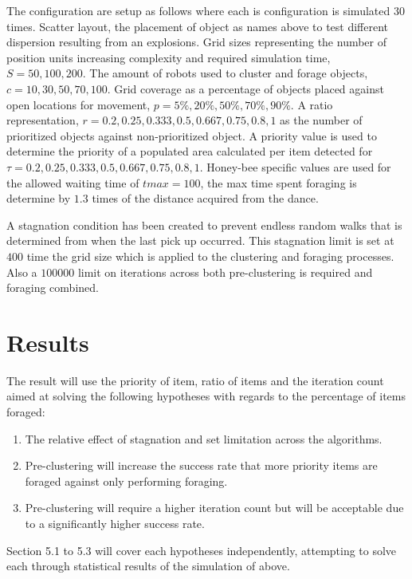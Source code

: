 \documentclass[12pt]{article}
\begin{document}
\par{The configuration are setup as follows where each is configuration is simulated 30 times. Scatter layout, the placement of object as names above to test different dispersion resulting from an explosions. Grid sizes representing the number of position units increasing complexity and required simulation time, $S = 50, 100, 200$. The amount of robots used to cluster and forage objects, $c = 10, 30, 50, 70, 100$. Grid coverage as a percentage of objects placed against open locations for movement, $p = 5\%, 20\%, 50\%, 70\%, 90\%$. A ratio representation, $r = 0.2, 0.25, 0.333, 0.5, 0.667, 0.75, 0.8, 1$ as the number of prioritized objects against non-prioritized object. A priority value is used to determine the priority of a populated area calculated per item detected for $\tau = 0.2, 0.25, 0.333, 0.5, 0.667, 0.75, 0.8, 1$. Honey-bee specific values are used for the allowed waiting time of $tmax = 100$, the max time spent foraging is determine by $1.3$ times of the distance acquired from the dance.}

\par{A stagnation condition has been created to prevent endless random walks that is determined from when the last pick up occurred. This stagnation limit is set at $400$ time the grid size which is applied to the clustering and foraging processes. Also a $100 000$ limit on iterations across both pre-clustering is required and foraging combined.}

\section{Results}

The result will use the priority of item, ratio of items and the iteration count aimed at solving the following hypotheses with regards to the percentage of items foraged: 
\begin{enumerate}[nolistsep]
	\item The relative effect of stagnation and set limitation across the algorithms.
	\item Pre-clustering will increase the success rate that more priority items are foraged against only performing foraging.
	\item Pre-clustering will require a higher iteration count but will be acceptable due to a significantly higher success rate.
\end{enumerate}
Section 5.1 to 5.3 will cover each hypotheses independently, attempting to solve each through statistical results of the simulation of above. 
\end{document}
